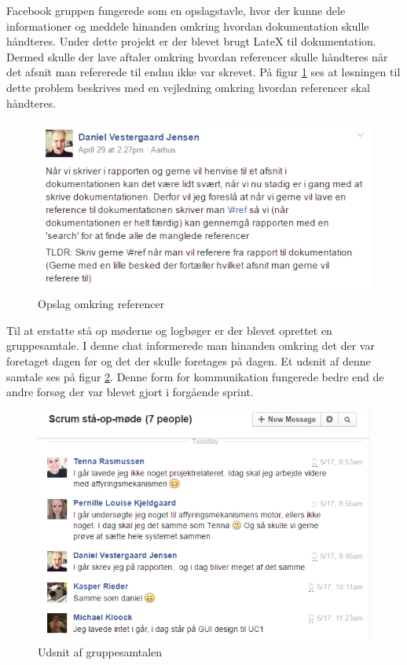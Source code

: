 Facebook gruppen fungerede som en opslagstavle, hvor der kunne dele informationer og meddele hinanden omkring hvordan dokumentation skulle håndteres. Under dette projekt er der blevet brugt LateX til dokumentation. Dermed skulle der lave aftaler omkring hvordan referencer skulle håndteres når det afsnit man refererede til endnu ikke var skrevet. På figur \ref{ref:fblatex} ses at løsningen til dette problem beskrives med en vejledning omkring hvordan referencer skal håndteres.

\begin{figure}[H]
	\centering
	\includegraphics[scale=0.6]{Projektgennemfoerelse/images/fblatex}
	\caption{Opslag omkring referencer}
	\label{ref:fblatex}
\end{figure}

Til at erstatte stå op møderne og logbøger er der blevet oprettet en gruppesamtale. I denne chat informerede man hinanden omkring det der var foretaget dagen før og det der skulle foretages på dagen. Et udsnit af denne samtale ses på figur \ref{ref:fbchat}. Denne form for kommunikation fungerede bedre end de andre forsøg der var blevet gjort i forgående sprint. 

\begin{figure}[H]
	\centering
	\includegraphics[scale=0.6]{Projektgennemfoerelse/images/fbstandup}
	\caption{Udsnit af gruppesamtalen}
	\label{ref:fbchat}
\end{figure}

